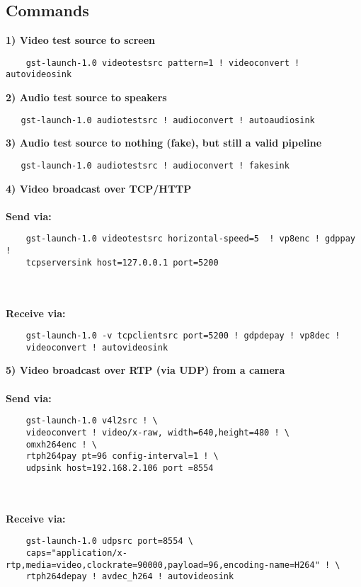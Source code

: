 \subsection{Commands}
\textbf{1) Video test source to screen}
\begin{verbatim}
    gst-launch-1.0 videotestsrc pattern=1 ! videoconvert ! autovideosink
\end{verbatim}

\textbf{2) Audio test source to speakers}
\begin{verbatim}
   gst-launch-1.0 audiotestsrc ! audioconvert ! autoaudiosink
\end{verbatim}

\textbf{3) Audio test source to nothing (fake), but still a valid pipeline}
\begin{verbatim}
   gst-launch-1.0 audiotestsrc ! audioconvert ! fakesink
\end{verbatim}

\textbf{4) Video broadcast over TCP/HTTP}\\\\
\textbf{Send via:}
\begin{verbatim}
    gst-launch-1.0 videotestsrc horizontal-speed=5  ! vp8enc ! gdppay !
    tcpserversink host=127.0.0.1 port=5200
\end{verbatim}\\\\
\textbf{Receive via:}
\begin{verbatim}
    gst-launch-1.0 -v tcpclientsrc port=5200 ! gdpdepay ! vp8dec !
    videoconvert ! autovideosink
\end{verbatim}


\textbf{5) Video broadcast over RTP (via UDP) from a camera}\\\\
\textbf{Send via:}
\begin{verbatim}
    gst-launch-1.0 v4l2src ! \
	videoconvert ! video/x-raw, width=640,height=480 ! \
	omxh264enc ! \
    rtph264pay pt=96 config-interval=1 ! \
    udpsink host=192.168.2.106 port =8554
\end{verbatim}\\\\
\textbf{Receive via:}
\begin{verbatim}
    gst-launch-1.0 udpsrc port=8554 \
	caps="application/x-					  rtp,media=video,clockrate=90000,payload=96,encoding-name=H264" ! \
	rtph264depay ! avdec_h264 ! autovideosink
\end{verbatim}


